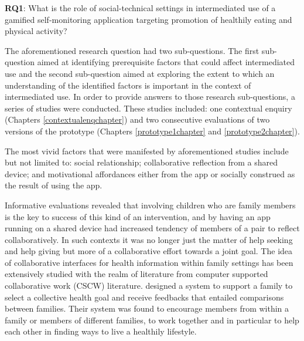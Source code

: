 \textbf{RQ1}: What is the role of social-technical settings in intermediated use of a gamified self-monitoring application targeting promotion of healthily eating and physical activity? 

The aforementioned research question had two sub-questions. The first sub-question aimed at identifying prerequisite factors that could affect intermediated use and the second sub-question aimed at exploring the extent to which an understanding of the identified factors is important in the context of intermediated use. In order to provide answers to those research sub-questions, a series of studies were conducted. These studies included: one contextual enquiry (Chapters \ref{contextualenqchapter}) and two consecutive evaluations of two versions of the prototype (Chapters \ref{prototype1chapter} and \ref{prototype2chapter}). 

The most vivid factors that were manifested by aforementioned studies include but not limited to: social relationship; collaborative reflection from a shared device; and motivational affordances  either from the app or socially construed as the result of using the app. 

Informative evaluations revealed that involving children who are family members is the key to success of this kind of an intervention, and by having an app running on a shared device had increased tendency of members of a pair to reflect collaboratively. In such contexts it was no longer just the matter of help seeking and help giving but more of a collaborative effort towards a joint goal. The idea of collaborative interfaces for health information within family settings has been extensively studied with the realm of literature from  computer supported collaborative work (CSCW) literature. \cite{colineau2011motivating} designed a system to support a family to select a collective health goal and receive feedbacks that entailed comparisons between families. Their system was found to encourage members from within a family or members of different families, to work together and in particular to help each other in finding ways to live a healthily lifestyle. 

